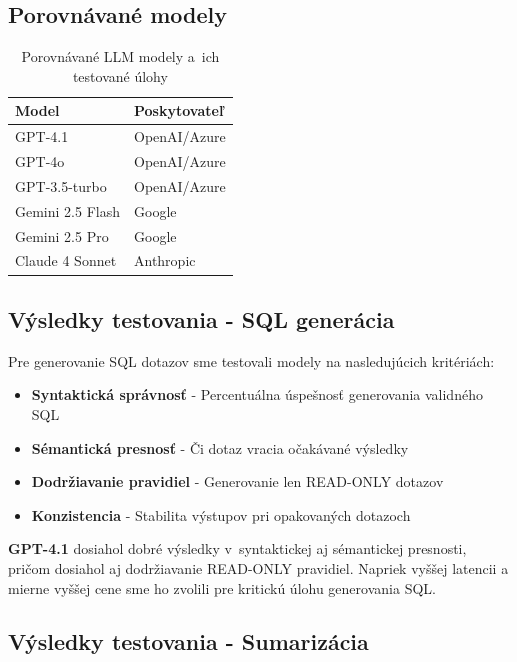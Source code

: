 \documentclass[a4paper, 12pt]{article}
\begin{document}
\subsection{Porovnávané modely}

\begin{table}[H]
\centering
\begin{tabular}{ll}
\toprule
\textbf{Model} & \textbf{Poskytovateľ}  \\
\midrule
GPT-4.1 & OpenAI/Azure  \\
GPT-4o & OpenAI/Azure  \\
GPT-3.5-turbo & OpenAI/Azure  \\
Gemini 2.5 Flash & Google  \\
Gemini 2.5 Pro & Google  \\
Claude 4 Sonnet & Anthropic  \\
\bottomrule
\end{tabular}
\caption{Porovnávané LLM modely a~ich testované úlohy}
\end{table}

\subsection{Výsledky testovania - SQL generácia}

Pre generovanie SQL dotazov sme testovali modely na nasledujúcich kritériách:

\begin{itemize}
    \item \textbf{Syntaktická správnosť} - Percentuálna úspešnosť generovania validného SQL
    \item \textbf{Sémantická presnosť} - Či dotaz vracia očakávané výsledky
    \item \textbf{Dodržiavanie pravidiel} - Generovanie len READ-ONLY dotazov
    \item \textbf{Konzistencia} - Stabilita výstupov pri opakovaných dotazoch
\end{itemize}

\textbf{GPT-4.1} dosiahol dobré výsledky v~syntaktickej aj sémantickej presnosti, pričom dosiahol aj dodržiavanie READ-ONLY pravidiel. Napriek vyššej latencii a mierne vyššej cene sme ho zvolili pre kritickú úlohu generovania SQL.

\subsection{Výsledky testovania - Sumarizácia}
\end{document}
